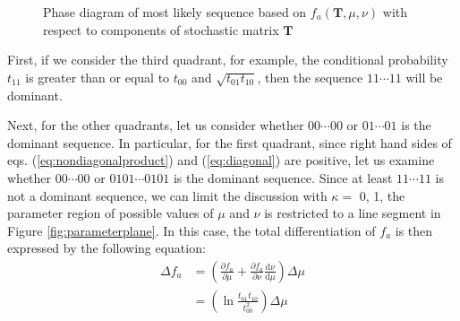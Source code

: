 ﻿\documentclass[a3paper,xelatex,english]{bxjsarticle}
\newcommand\mib[1]{\boldsymbol{#1}}
\begin{document}
\begin{figure}[htbp]
\centering


\caption{Phase diagram of most likely sequence based on $f_{a}(\mib{T}, \mu, \nu)$ with respect to components of stochastic matrix $\mib{T}$}
\label{fig:phasediagram}
\end{figure}

First, if we consider the third quadrant, for example, the conditional probability $t_{11}$ is greater than or equal to $t_{00}$ and $\sqrt{t_{01}t_{10}}$, then the sequence $11 \cdots 11$ will be dominant.

Next, for the other quadrants, let us consider whether $00 \cdots 00$ or $01 \cdots 01$ is the dominant sequence. 
In particular, for the first quadrant, since right hand sides of eqs. (\ref{eq:nondiagonalproduct}) and (\ref{eq:diagonal}) are positive, let us examine whether $00 \cdots 00$ or $0101 \cdots 0101$ is the dominant sequence. 
Since at least $11 \cdots 11$ is not a dominant sequence, we can limit the discussion with $\kappa =$ 0, 1, the parameter region of possible values of $\mu$ and $\nu$ is restricted to a line segment in Figure \ref{fig:parameterplane}. 
In this case, the total differentiation of $f_{a}$ is then expressed by the following equation:
\begin{align}
\Delta f_{a} 
&= 
\left( 
\frac{\partial f_{a}}{\partial \mu} 
+ 
\frac{\partial f_{a}}{\partial \nu} 
\frac{{\mathrm d} \nu}{{\mathrm d} \mu}
\right) 
\Delta \mu 
\nonumber 
\\
&= 
\left(
\ln \frac{t_{01}t_{10}}{t_{00}^{2}}
\right)
\Delta \mu
	\label{expression:totaldiff}
\end{align}
\end{document}
